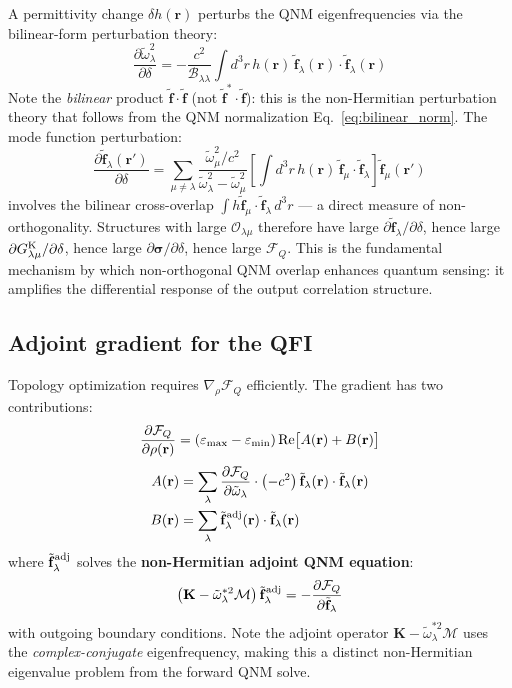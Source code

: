 \documentclass[12pt]{article}
\newcommand{\Keldysh}{{\rm K}}
\newcommand{\tf}{\tilde{\mathbf{f}}}
\newcommand{\tomega}{\tilde{\omega}}
\begin{document}
A permittivity change $\delta h(\mathbf{r})$ perturbs the QNM
eigenfrequencies via the bilinear-form perturbation theory:
\begin{equation}
  \frac{\partial\tomega_\lambda^2}{\partial\delta} =
  -\frac{c^2}{\mathcal{B}_{\lambda\lambda}}
  \int d^3r\, h(\mathbf{r})\,\tf_\lambda(\mathbf{r})\cdot\tf_\lambda(\mathbf{r})
  \label{eq:omega_pert}
\end{equation}
Note the \emph{bilinear} product $\tf\cdot\tf$ (not $\tf^*\cdot\tf$):
this is the non-Hermitian perturbation theory that follows from the QNM
normalization Eq.~\eqref{eq:bilinear_norm}.  The mode function perturbation:
\begin{equation}
  \frac{\partial\tf_\lambda(\mathbf{r}')}{\partial\delta} =
  \sum_{\mu\neq\lambda}
  \frac{\tomega_\mu^2/c^2}{\tomega_\lambda^2-\tomega_\mu^2}
  \!\left[\int d^3r\,h(\mathbf{r})\,\tf_\mu\cdot\tf_\lambda\right]
  \tf_\mu(\mathbf{r}')
  \label{eq:mode_pert}
\end{equation}
involves the bilinear cross-overlap $\int h\tf_\mu\cdot\tf_\lambda\,d^3r$
--- a direct measure of non-orthogonality.  Structures with large
$\mathcal{O}_{\lambda\mu}$ therefore have large $\partial\tf_\lambda/\partial\delta$,
hence large $\partial G^\Keldysh_{\lambda\mu}/\partial\delta$, hence
large $\partial\boldsymbol{\sigma}/\partial\delta$, hence large
$\mathcal{F}_Q$.  This is the fundamental mechanism by which
non-orthogonal QNM overlap enhances quantum sensing: it amplifies the
differential response of the output correlation structure.

\subsection{Adjoint gradient for the QFI}

Topology optimization requires $\nabla_\rho\mathcal{F}_Q$ efficiently.
The gradient has two contributions:
\begin{equation}
  \frac{\partial\mathcal{F}_Q}{\partial\rho(\mathbf{r})} =
  (\varepsilon_{\rm max}-\varepsilon_{\rm min})\,\mathrm{Re}\bigl[
  A(\mathbf{r}) + B(\mathbf{r})\bigr]
  \label{eq:TO_gradient}
\end{equation}
\begin{align}
  A(\mathbf{r}) &= \sum_\lambda
  \frac{\partial\mathcal{F}_Q}{\partial\tomega_\lambda}\cdot
  \left(-c^2\right)\tf_\lambda(\mathbf{r})\cdot\tf_\lambda(\mathbf{r})
  \label{eq:grad_A}\\
  B(\mathbf{r}) &= \sum_\lambda
  \tf_\lambda^{\rm adj}(\mathbf{r})\cdot\tf_\lambda(\mathbf{r})
  \label{eq:grad_B}
\end{align}
where $\tf_\lambda^{\rm adj}$ solves the \textbf{non-Hermitian adjoint
QNM equation}:
\begin{equation}
  \left(\mathbf{K}-\tomega_\lambda^{*2}\mathcal{M}\right)
  \tf_\lambda^{\rm adj} =
  -\frac{\partial\mathcal{F}_Q}{\partial\tf_\lambda}
  \label{eq:adjoint_QNM}
\end{equation}
with outgoing boundary conditions.  Note the adjoint operator
$\mathbf{K}-\tomega_\lambda^{*2}\mathcal{M}$ uses the
\emph{complex-conjugate} eigenfrequency, making this a distinct
non-Hermitian eigenvalue problem from the forward QNM solve.
\end{document}
